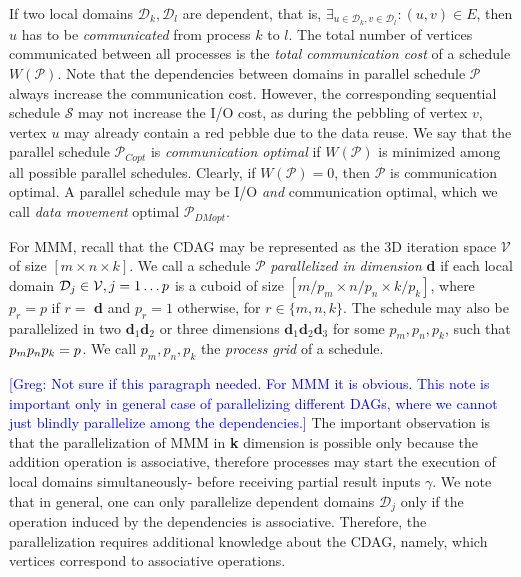 \documentclass[sigplan,review,anonymous]{acmart}\settopmatter{printfolios=true,printccs=false,printacmref=false}
\newcommand\greg[1]{\textcolor{blue}{[Greg: #1]}}
\begin{document}
If two local domains $\mathcal{D}_k, \mathcal{D}_l$ are dependent, that is, 
\linebreak
$\exists_{u \in \mathcal{D}_k, v \in \mathcal{D}_l} : (u,v) \in E$, then $u$ 
has to be \emph{communicated} from process $k$ to $l$. The total number of 
vertices communicated between all processes is the \emph{total communication 
cost} of a schedule $W(\mathcal{P})$. 
Note that the dependencies between domains in parallel schedule $\mathcal{P}$ 
always increase the communication cost. However, the corresponding sequential 
schedule $\mathcal{S}$ may not increase the I/O cost, as 
during the pebbling of vertex $v$, vertex $u$ may already contain a red pebble 
due to the data reuse.
We say that the parallel schedule 
$\mathcal{P}_{Copt}$ is \emph{communication optimal} if $W(\mathcal{P})$ 
is minimized among all possible parallel schedules. Clearly, if 
$W(\mathcal{P}) = 0$, then $\mathcal{P}$ is communication optimal. A 
parallel schedule may be I/O \emph{and} communication optimal, which we call 
\emph{data movement} optimal 
$\mathcal{P}_{DMopt}$.

For MMM, recall that the CDAG may be represented as the 3D iteration space 
$\mathcal{V}$ of size $[m \times n \times k]$. We call a 
schedule $\mathcal{P}$ \emph{parallelized in dimension} \textbf{d} if each 
local domain $\mathcal{D}_j \in \mathcal{V}, j =\nobreak 1 \dots p$
is a cuboid of size $[m/p_m \times n/p_n \times k/p_k]$, where $p_r = 
p$ if $r 
= $ \textbf{d} and $p_r = 1$ otherwise, for $r \in \{m, n, k\}$. The schedule 
may also be parallelized in two $\mathbf{d}_1\mathbf{d}_2$ 
or three 
dimensions $\mathbf{d}_1\mathbf{d}_2\mathbf{d}_3$ for some $p_m, p_n, p_k$, 
such that $p_m p_n p_k= \nobreak p$. We call $p_m, p_n, p_k$ the 
\emph{process grid} of a schedule.

\greg{Not sure if this paragraph needed. For MMM it is obvious. This note is 
important only in general case of parallelizing different DAGs, where we cannot 
just blindly parallelize among the dependencies.}
The important observation is that the parallelization of MMM in \textbf{k} 
dimension is possible only because the addition operation is associative, 
therefore processes may start the execution of local domains simultaneously- 
before receiving partial result inputs $\gamma$. We note that in general, one 
can only parallelize dependent domains $\mathcal{D}_j$ only if the operation 
induced by the dependencies is associative. Therefore, the parallelization 
requires additional knowledge about the CDAG, namely, which vertices correspond 
to associative operations.
\end{document}

